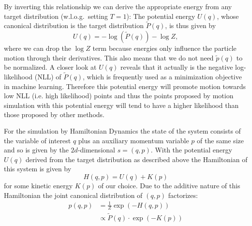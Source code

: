 \documentclass[12pt]{scrartcl}
\begin{document}
By inverting this relationship we can derive the appropriate energy from any target distribution (w.l.o.g.\ setting $T=1$): The potential energy $U(q)$, whose canonical distribution is the target distribution $\tilde{P}(q)$, is thus given by
\begin{equation}
U(q) = -\log \left( \tilde{P}(q) \right) - \log Z,
\end{equation}
where we can drop the $\log Z$ term because energies only influence the particle motion through their derivatives. This also means that we do not need $\tilde{p}(q)$ to be normalized. A closer look at $U(q)$ reveals that it actually is the negative log-likelihood (NLL) of $\tilde{P}(q)$, which is frequently used as a minimization objective in machine learning. Therefore this potential energy will promote motion towards low NLL (i.e. high likelihood) points and thus the points proposed by motion simulation with this potential energy will tend to have a higher likelihood than those proposed by other methods.

For the simulation by Hamiltonian Dynamics the state of the system consists of the variable of interest $q$ plus an auxiliary momentum variable $p$ of the same size and so is given by the $2d$-dimensional $s = (q, p)$. With the potential energy $U(q)$ derived from the target distribution as described above the Hamiltonian of this system is given by
\begin{equation}
H(q, p) = U(q) + K(p)
\end{equation}
for some kinetic energy $K(p)$ of our choice. Due to the additive nature of this Hamiltonian the joint canonical distribution of $(q, p)$ factorizes:
\begin{equation}
\begin{split}
p(q, p) &= \frac{1}{Z} \exp \left( -H(q, p) \right) \\
			&\propto \tilde{P}(q) \cdot \exp{(-K(p))}
\end{split}
\end{equation}
\end{document}
